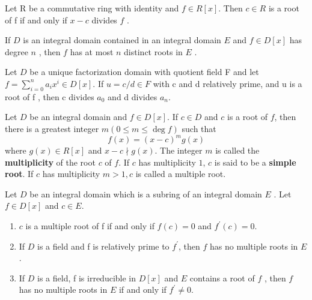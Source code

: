 \begin{theorem}
    Let R be a commutative ring with identity and $f \in R[x]$. Then $c \in R$ is a root of f if and only if $x-c$ divides $f$ .
\end{theorem}


\begin{theorem}
    If $D$ is an integral domain contained in an integral domain $E$ and $f \in D[x]$ has degree $n$ , then $f$ has at most $n$ distinct roots in $E$ .
\end{theorem}


\begin{theorem}
    Let $D$ be a unique factorization domain with quotient field F and let $f=\sum_{i=0}^n a_{i} x^{i} \in D[x]$. If $u=c / d \in F$ with c and d relatively prime, and u is a root of f , then c divides $a_0$ and d divides $a_{n}$.
\end{theorem}

\begin{definition}
    Let $D$ be an integral domain and $f \in D[x]$.
    If $c \in D$ and $c$ is a root of $f$, then there is a greatest integer $m(0 \leq m \leq \operatorname{deg} f)$ such that
    \begin{equation*}
        f(x)=(x-c)^m g(x)
    \end{equation*}
    where $g(x) \in R[x]$ and $x-c \nmid g(x)$.
    The integer $m$ is called the \textbf{multiplicity} of the root $c$ of $f$.
    If $c$ has multiplicity $1$, $c$ is said to be a \textbf{simple root}.
    If $c$ has multiplicity $m>1, c$ is called a multiple root.
\end{definition}

\begin{theorem}
    Let $D$ be an integral domain which is a subring of an integral domain $E$ . Let $f \in D[x]$ and $c \in E$.
    \begin{enumerate}
        \item
              $c$ is a multiple root of f if and only if $f(c)=0$ and $f^{\prime}(c)=0$.
        \item
              If $D$ is a field and f is relatively prime to $f^{\prime}$, then $f$ has no multiple roots in $E$.
        \item
              If $D$ is a field, f is irreducible in $D[x]$ and $E$ contains a root of $f$ , then $f$ has no multiple roots in $E$ if and only if $f^{\prime} \neq 0$.
    \end{enumerate}
\end{theorem}

